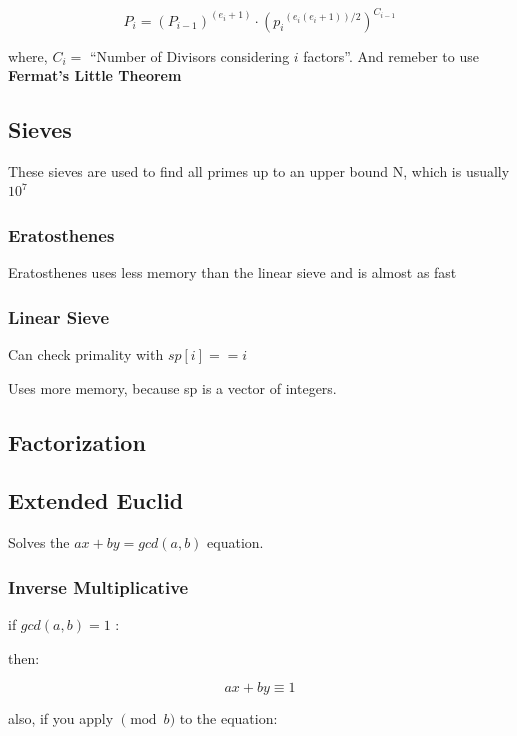 	$$ P_i = (P_{i-1})^{(e_i + 1)} \cdot ({p_i}^{(e_i(e_i + 1))/2})^{C_{i-1}} $$
	
	where, $ C_i = $ ``Number of Divisors considering $i$ factors''.
	And remeber to use \textbf{Fermat's Little Theorem}
	
\subsection{Sieves}
	
	These sieves are used to find all primes up to an upper bound N, which is usually $10^7$

	\subsubsection{Eratosthenes}

		Eratosthenes uses less memory than the linear sieve and is almost as fast


	\subsubsection{Linear Sieve}

		Can check primality with $sp[i] == i$

		Uses more memory, because sp is a vector of integers.


\subsection{Factorization}


\subsection{Extended Euclid}
	
	Solves the $ ax + by = gcd(a, b)$ equation.

	\subsubsection{Inverse Multiplicative}

	if \textbf{ $gcd(a, b) = 1$ }:

	then:

	$$ax + by \equiv 1$$

	also, if you apply $\pmod{b}$ to the equation:

